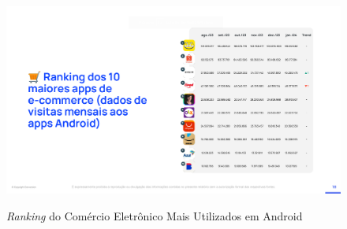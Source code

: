 \begin{figure}[ht]
    \centering
    \caption{\textit{Ranking} do Comércio Eletrônico Mais Utilizados em Android}
    \includegraphics[keepaspectratio=true,scale=0.5]{figuras/cap05ConversionJan2024_3.png}
    \label{fig07}
\end{figure}

